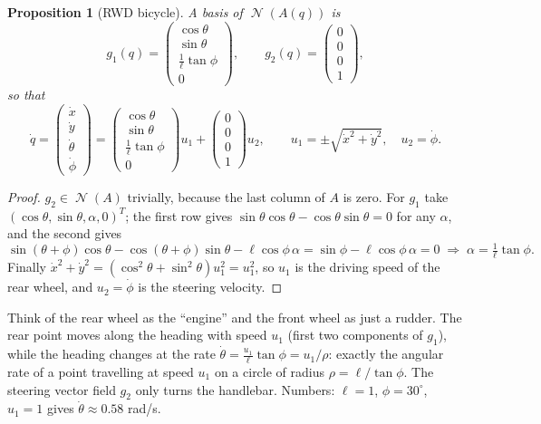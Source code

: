 \documentclass[11pt,a4paper]{article}
\DeclareMathOperator{\Ker}{\mathcal{N}}
\theoremstyle{definition}
\theoremstyle{plain}
\newtheorem{proposition}[definition]{Proposition}
\theoremstyle{remark}
\begin{document}
\begin{proposition}[RWD bicycle]
\label{prop:rwd}
A basis of $\Ker(A(q))$ is
\[
g_1(q)=\begin{pmatrix}\cos\theta\\ \sin\theta\\ \frac1\ell\tan\phi\\ 0\end{pmatrix},\qquad
g_2(q)=\begin{pmatrix}0\\0\\0\\1\end{pmatrix},
\]
so that
\[
\dot q=\begin{pmatrix}\dot x\\\dot y\\\dot\theta\\\dot\phi\end{pmatrix}
=\begin{pmatrix}\cos\theta\\ \sin\theta\\ \frac1\ell\tan\phi\\ 0\end{pmatrix}u_1
+\begin{pmatrix}0\\0\\0\\1\end{pmatrix}u_2,
\qquad u_1=\pm\sqrt{\dot x^2+\dot y^2},\quad u_2=\dot\phi .
\]
\end{proposition}
\begin{proof}
$g_2\in\Ker(A)$ trivially, because the last column of $A$ is zero. For $g_1$ take $(\cos\theta,\sin\theta,\alpha,0)^T$; the first row gives $\sin\theta\cos\theta-\cos\theta\sin\theta=0$ for any $\alpha$, and the second gives
\[
\sin(\theta+\phi)\cos\theta-\cos(\theta+\phi)\sin\theta-\ell\cos\phi\,\alpha=\sin\phi-\ell\cos\phi\,\alpha=0
\;\Longrightarrow\;\alpha=\tfrac1\ell\tan\phi .
\]
Finally $\dot x^2+\dot y^2=(\cos^2\theta+\sin^2\theta)u_1^2=u_1^2$, so $u_1$ is the driving speed of the rear wheel, and $u_2=\dot\phi$ is the steering velocity.
\end{proof}

\begin{intuition}
Think of the rear wheel as the ``engine'' and the front wheel as just a rudder. The rear point moves along the heading with speed $u_1$ (first two components of $g_1$), while the heading changes at the rate $\dot\theta=\frac{u_1}{\ell}\tan\phi=u_1/\rho$: exactly the angular rate of a point travelling at speed $u_1$ on a circle of radius $\rho=\ell/\tan\phi$. The steering vector field $g_2$ only turns the handlebar. Numbers: $\ell=1$, $\phi=30^\circ$, $u_1=1$ gives $\dot\theta\approx0.58$ rad/s.
\end{intuition}
\end{document}

